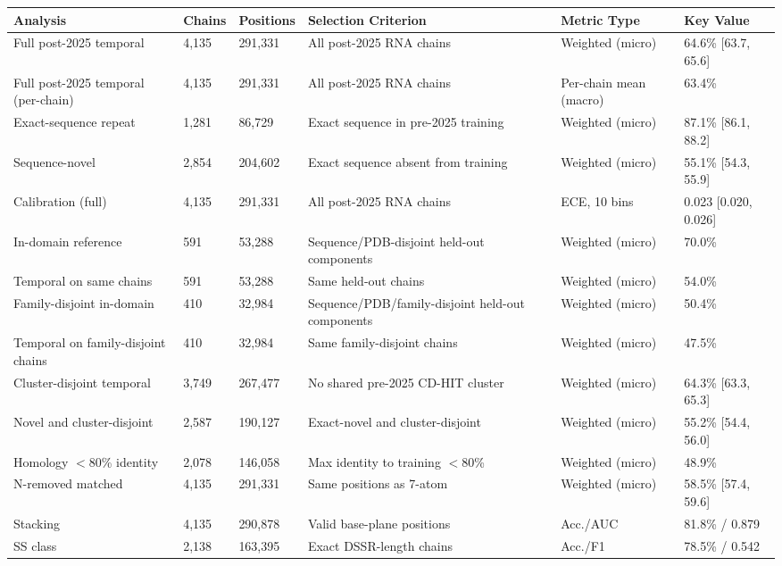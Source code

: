 \documentclass[pdflatex,sn-nature]{sn-jnl}
\begin{document}
\begingroup\footnotesize
\begin{adjustbox}{width=\textwidth}
\begin{tabular}{p{}p{}p{}p{}p{}p{}}
\toprule
Analysis & Chains & Positions & Selection Criterion & Metric Type & Key Value \\
\midrule
Full post-2025 temporal & 4,135 & 291,331 & All post-2025 RNA chains & Weighted (micro) & 64.6\% [63.7, 65.6] \\
Full post-2025 temporal (per-chain) & 4,135 & 291,331 & All post-2025 RNA chains & Per-chain mean (macro) & 63.4\% \\
Exact-sequence repeat & 1,281 & 86,729 & Exact sequence in pre-2025 training & Weighted (micro) & 87.1\% [86.1, 88.2] \\
Sequence-novel & 2,854 & 204,602 & Exact sequence absent from training & Weighted (micro) & 55.1\% [54.3, 55.9] \\
Calibration (full) & 4,135 & 291,331 & All post-2025 RNA chains & ECE, 10 bins & 0.023 [0.020, 0.026] \\
In-domain reference & 591 & 53,288 & Sequence/PDB-disjoint held-out components & Weighted (micro) & 70.0\% \\
Temporal on same chains & 591 & 53,288 & Same held-out chains & Weighted (micro) & 54.0\% \\
Family-disjoint in-domain & 410 & 32,984 & Sequence/PDB/family-disjoint held-out components & Weighted (micro) & 50.4\% \\
Temporal on family-disjoint chains & 410 & 32,984 & Same family-disjoint chains & Weighted (micro) & 47.5\% \\
Cluster-disjoint temporal & 3,749 & 267,477 & No shared pre-2025 CD-HIT cluster & Weighted (micro) & 64.3\% [63.3, 65.3] \\
Novel and cluster-disjoint & 2,587 & 190,127 & Exact-novel and cluster-disjoint & Weighted (micro) & 55.2\% [54.4, 56.0] \\
Homology $<$80\% identity & 2,078 & 146,058 & Max identity to training $<$80\% & Weighted (micro) & 48.9\% \\
N-removed matched & 4,135 & 291,331 & Same positions as 7-atom & Weighted (micro) & 58.5\% [57.4, 59.6] \\
Stacking & 4,135 & 290,878 & Valid base-plane positions & Acc./AUC & 81.8\% / 0.879 \\
SS class & 2,138 & 163,395 & Exact DSSR-length chains & Acc./F1 & 78.5\% / 0.542 \\

\end{tabular}
\end{adjustbox}
\end{document}
